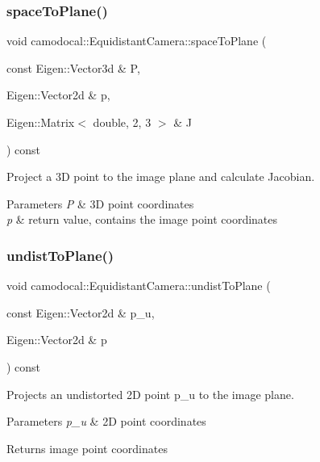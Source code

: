\subsubsection{\texorpdfstring{space\+To\+Plane()}{spaceToPlane()}\hspace{0.1cm}{\footnotesize\ttfamily [2/2]}}
{\footnotesize\ttfamily void camodocal\+::\+Equidistant\+Camera\+::space\+To\+Plane (\begin{DoxyParamCaption}\item[{const Eigen\+::\+Vector3d \&}]{P,  }\item[{Eigen\+::\+Vector2d \&}]{p,  }\item[{Eigen\+::\+Matrix$<$ double, 2, 3 $>$ \&}]{J }\end{DoxyParamCaption}) const}



Project a 3D point to the image plane and calculate Jacobian. 


\begin{DoxyParams}{Parameters}
{\em P} & 3D point coordinates \\
\hline
{\em p} & return value, contains the image point coordinates \\
\hline
\end{DoxyParams}
\mbox{\label{classcamodocal_1_1EquidistantCamera_ac0aae0a472fac59ad5fc22079eb5560d}} 
\subsubsection{\texorpdfstring{undist\+To\+Plane()}{undistToPlane()}}
{\footnotesize\ttfamily void camodocal\+::\+Equidistant\+Camera\+::undist\+To\+Plane (\begin{DoxyParamCaption}\item[{const Eigen\+::\+Vector2d \&}]{p\+\_\+u,  }\item[{Eigen\+::\+Vector2d \&}]{p }\end{DoxyParamCaption}) const\hspace{0.3cm}{\ttfamily [virtual]}}



Projects an undistorted 2D point p\+\_\+u to the image plane. 


\begin{DoxyParams}{Parameters}
{\em p\+\_\+u} & 2D point coordinates \\
\hline
\end{DoxyParams}
\begin{DoxyReturn}{Returns}
image point coordinates 
\end{DoxyReturn}


